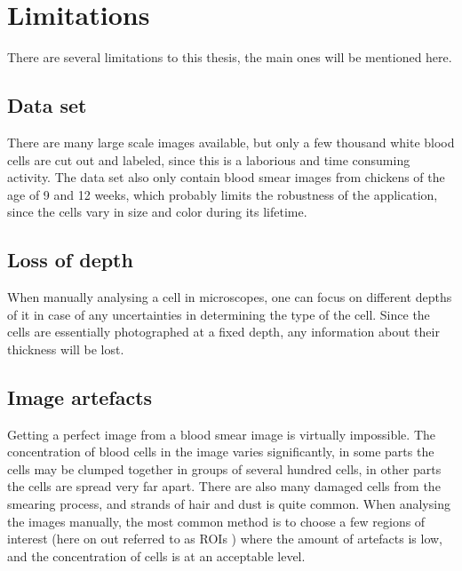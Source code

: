 \section{Limitations}
There are several limitations to this thesis, the main ones will be mentioned here.

\subsection{Data set}
There are many large scale images available, but only a few thousand white blood cells are cut out and labeled, since this is a laborious and time consuming activity. The data set also only contain blood smear images from chickens of the age of 9 and 12 weeks, which probably limits the robustness of the application, since the cells vary in size and color during its lifetime.

\subsection{Loss of depth}
When manually analysing a cell in microscopes, one can focus on different depths of it in case of any uncertainties in determining the type of the cell. Since the cells are essentially photographed at a fixed depth, any information about their thickness will be lost. 

\subsection{Image artefacts}
Getting a perfect image from a blood smear image is virtually impossible. The concentration of blood cells in the image varies significantly, in some parts the cells may be clumped together in groups of several hundred cells, in other parts the cells are spread very far apart. There are also many damaged cells from the smearing process, and strands of hair and dust is quite common. When analysing the images manually, the most common method is to choose a few regions of interest (here on out referred to as ROIs ) where the amount of artefacts is low, and the concentration of cells is at an acceptable level.


